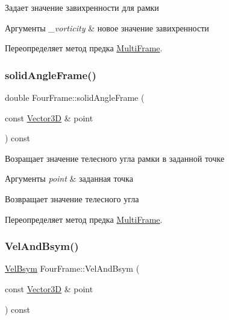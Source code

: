Задает значение завихренности для рамки 
\begin{DoxyParams}{Аргументы}
{\em \+\_\+vorticity} & новое значение завихренности \\
\hline
\end{DoxyParams}


Переопределяет метод предка \mbox{\hyperlink{class_multi_frame_ae06b45f3403f1c6b03d3c6d58aa9f519}{Multi\+Frame}}.

\mbox{\label{class_four_frame_ad48011ddf75d8af53e02cb51145701bf}} 
\subsubsection{\texorpdfstring{solid\+Angle\+Frame()}{solidAngleFrame()}}
{\footnotesize\ttfamily double Four\+Frame\+::solid\+Angle\+Frame (\begin{DoxyParamCaption}\item[{const \mbox{\hyperlink{class_vector3_d}{Vector3D}} \&}]{point }\end{DoxyParamCaption}) const\hspace{0.3cm}{\ttfamily [virtual]}}

Возращает значение телесного угла рамки в заданной точке 
\begin{DoxyParams}{Аргументы}
{\em point} & заданная точка \\
\hline
\end{DoxyParams}
\begin{DoxyReturn}{Возвращает}
значение телесного угла 
\end{DoxyReturn}


Переопределяет метод предка \mbox{\hyperlink{class_multi_frame_af0c54493c44094ca492e2ec653a3a956}{Multi\+Frame}}.

\mbox{\label{class_four_frame_a950100331ec16cb70fc8d89fce01e84f}} 
\subsubsection{\texorpdfstring{Vel\+And\+Bsym()}{VelAndBsym()}}
{\footnotesize\ttfamily \mbox{\hyperlink{struct_vel_bsym}{Vel\+Bsym}} Four\+Frame\+::\+Vel\+And\+Bsym (\begin{DoxyParamCaption}\item[{const \mbox{\hyperlink{class_vector3_d}{Vector3D}} \&}]{point }\end{DoxyParamCaption}) const\hspace{0.3cm}{\ttfamily [virtual]}}

